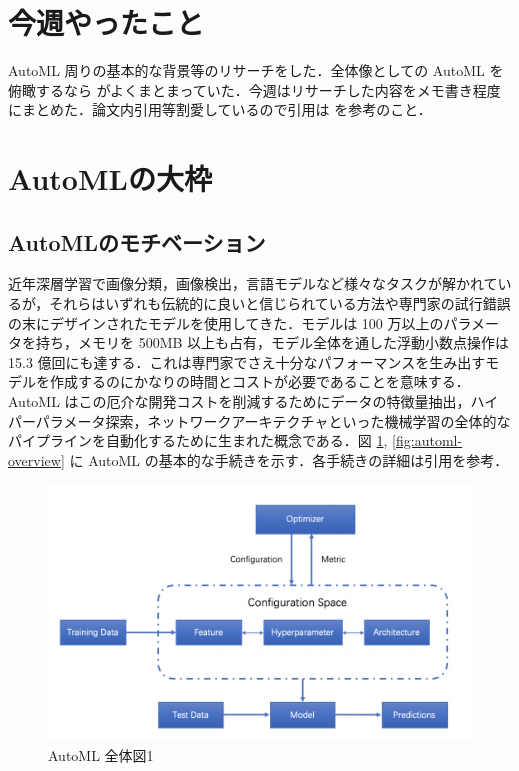 \documentclass[twocolumn]{ujarticle}   %
\begin{document}

	\section{今週やったこと}
	AutoML 周りの基本的な背景等のリサーチをした．全体像としての AutoML を俯瞰するなら \cite{auto-ml} がよくまとまっていた．今週はリサーチした内容をメモ書き程度にまとめた．論文内引用等割愛しているので引用は \cite{automl-sota} を参考のこと．

	\section{AutoMLの大枠}
	\subsection{AutoMLのモチベーション}
	\cite{automl-sota} 近年深層学習で画像分類，画像検出，言語モデルなど様々なタスクが解かれているが，それらはいずれも伝統的に良いと信じられている方法や専門家の試行錯誤の末にデザインされたモデルを使用してきた．モデルは 100 万以上のパラメータを持ち，メモリを 500MB 以上も占有，モデル全体を通した浮動小数点操作は 15.3 億回にも達する．これは専門家でさえ十分なパフォーマンスを生み出すモデルを作成するのにかなりの時間とコストが必要であることを意味する．AutoML はこの厄介な開発コストを削減するためにデータの特徴量抽出，ハイパーパラメータ探索，ネットワークアーキテクチャといった機械学習の全体的なパイプラインを自動化するために生まれた概念である．図 \ref{fig:procedure}, \ref{fig:automl-overview} に AutoML の基本的な手続きを示す．各手続きの詳細は引用を参考．

	\begin{figure}[htb]
		\centering
		\includegraphics[width=1.0\columnwidth]{data/procedure.jpg}
		\caption{AutoML 全体図1}
		\label{fig:procedure}
	\end{figure}
\end{document}
